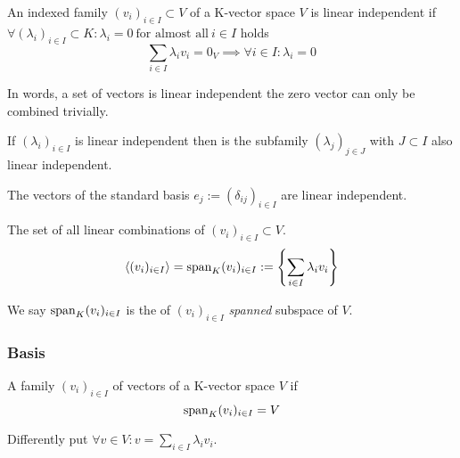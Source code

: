 \begin{definition}\label{def:lin_depend}
   An indexed family \((v_i)_{i \in I} \subset V\) of a K-vector space \(V\) is linear independent if \(\forall (\lambda_i)_{i \in I} \subset K: \lambda_i = 0~\text{for almost all}~i \in I\) holds
   \[\sum_{i \in I} \lambda_i v_i = 0_V \implies \forall i \in I: \lambda_i = 0\]
\end{definition}
\begin{remark}
   In words, a set of vectors is linear independent the zero vector can only be combined trivially.

   If \((\lambda_i)_{i \in I}\) is linear independent then is the subfamily \((\lambda_j)_{j \in J}\) with \(J \subset I\) also linear independent.
\end{remark}
\begin{example}
   The vectors of the standard basis \(e_j := (\delta_{ij})_{i \in I}\) are linear independent.
\end{example}

\begin{definition}[Span]
   The set of all linear combinations of \((v_i)_{i \in I} \subset V\).
   \[\langle (v_i)_{i \in I} \rangle = \operatorname{span}_{K}(v_i)_{i \in I} := \left\{\sum_{i \in I} \lambda_i v_i \right\}\]
\end{definition}
\begin{remark}
   We say \(\operatorname{span}_{K}(v_i)_{i \in I}\) is the of \((v_i)_{i \in I}\) \textit{spanned} subspace of \(V\).
\end{remark}

\subsubsection{Basis}
\begin{definition}[Generator]\label{def:generator}
   A family \((v_i)_{i \in I}\) of vectors of a K-vector space \(V\) if
   \[\operatorname{span}_{K}(v_i)_{i \in I} = V\]
\end{definition}
\begin{remark}
   Differently put \(\forall v \in V: v = \sum_{i \in I} \lambda_i v_i\).
\end{remark}

